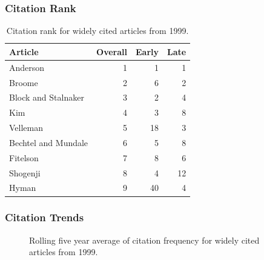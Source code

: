\documentclass[
  10pt,
  letterpaper,
  DIV=11,
  numbers=noendperiod,
  twoside]{scrartcl}
\begin{document}
\subsubsection*{Citation Rank}\label{sec-rank-1999}

\begin{longtable}[]{@{}lrrr@{}}

\caption{\label{tbl-citation-rank-1999}Citation rank for widely cited
articles from 1999.}

\tabularnewline

\toprule\noalign{}
Article & Overall & Early & Late \\
\midrule\noalign{}
\endhead
\bottomrule\noalign{}
\endlastfoot
Anderson & 1 & 1 & 1 \\
Broome & 2 & 6 & 2 \\
Block and Stalnaker & 3 & 2 & 4 \\
Kim & 4 & 3 & 8 \\
Velleman & 5 & 18 & 3 \\
Bechtel and Mundale & 6 & 5 & 8 \\
Fitelson & 7 & 8 & 6 \\
Shogenji & 8 & 4 & 12 \\
Hyman & 9 & 40 & 4 \\

\end{longtable}

\subsubsection*{Citation Trends}\label{sec-trends-1999}

\begin{figure}


\caption{\label{fig-citation-spaghetti-1999}Rolling five year average of
citation frequency for widely cited articles from 1999.}

\end{figure}%
\end{document}
